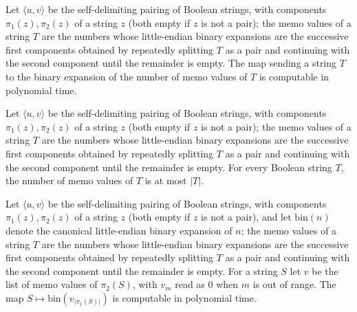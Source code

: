 \begin{theorem}
\label{Complexity.ladner_values_length_FP}
\leanok
{}
Let $\langle u,v\rangle$ be the self-delimiting pairing of Boolean strings, with components $\pi_1(z),\pi_2(z)$ of a string $z$ (both empty if $z$ is not a pair); the memo values of a string $T$ are the numbers whose little-endian binary expansions are the successive first components obtained by repeatedly splitting $T$ as a pair and continuing with the second component until the remainder is empty. The map sending a string $T$ to the binary expansion of the number of memo
values of $T$ is computable in polynomial time.
\end{theorem}

\begin{theorem}
\label{Complexity.ladner_values_length_le}
\leanok
{}
Let $\langle u,v\rangle$ be the self-delimiting pairing of Boolean strings, with components $\pi_1(z),\pi_2(z)$ of a string $z$ (both empty if $z$ is not a pair); the memo values of a string $T$ are the numbers whose little-endian binary expansions are the successive first components obtained by repeatedly splitting $T$ as a pair and continuing with the second component until the remainder is empty. For every Boolean string $T$, the number of memo values of $T$ is at most $|T|$.
\end{theorem}

\begin{theorem}
\label{Complexity.ladner_get_value_FP}
\leanok
{}
Let $\langle u,v\rangle$ be the self-delimiting pairing of Boolean strings, with components $\pi_1(z),\pi_2(z)$ of a string $z$ (both empty if $z$ is not a pair), and let $\mathrm{bin}(n)$ denote the canonical little-endian binary expansion of $n$; the memo values of a string $T$ are the numbers whose little-endian binary expansions are the successive first components obtained by repeatedly splitting $T$ as a pair and continuing with the second component until the remainder is empty. For a string $S$ let $v$ be the list of memo values of
$\pi_2(S)$, with $v_m$ read as $0$ when $m$ is out of range. The map
$S\mapsto\mathrm{bin}(v_{|\pi_1(S)|})$ is computable in polynomial time.
\end{theorem}

